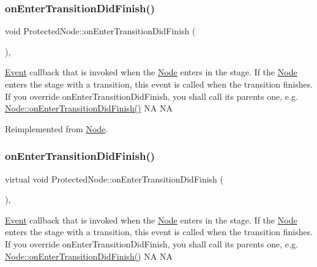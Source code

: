 \subsubsection{\texorpdfstring{on\+Enter\+Transition\+Did\+Finish()}{onEnterTransitionDidFinish()}\hspace{0.1cm}{\footnotesize\ttfamily [1/2]}}
{\footnotesize\ttfamily void Protected\+Node\+::on\+Enter\+Transition\+Did\+Finish (\begin{DoxyParamCaption}{ }\end{DoxyParamCaption})\hspace{0.3cm}{\ttfamily [override]}, {\ttfamily [virtual]}}

\hyperlink{classEvent}{Event} callback that is invoked when the \hyperlink{classNode}{Node} enters in the \textquotesingle{}stage\textquotesingle{}. If the \hyperlink{classNode}{Node} enters the \textquotesingle{}stage\textquotesingle{} with a transition, this event is called when the transition finishes. If you override on\+Enter\+Transition\+Did\+Finish, you shall call its parent\textquotesingle{}s one, e.\+g. \hyperlink{classNode_afef4b2a863042a9ea456e952cf26991d}{Node\+::on\+Enter\+Transition\+Did\+Finish()}  NA  NA 

Reimplemented from \hyperlink{classNode_afef4b2a863042a9ea456e952cf26991d}{Node}.

\mbox{\label{classProtectedNode_aac8fcdaf79295aa56c9b792d2e4135d6}} 
\subsubsection{\texorpdfstring{on\+Enter\+Transition\+Did\+Finish()}{onEnterTransitionDidFinish()}\hspace{0.1cm}{\footnotesize\ttfamily [2/2]}}
{\footnotesize\ttfamily virtual void Protected\+Node\+::on\+Enter\+Transition\+Did\+Finish (\begin{DoxyParamCaption}{ }\end{DoxyParamCaption})\hspace{0.3cm}{\ttfamily [override]}, {\ttfamily [virtual]}}

\hyperlink{classEvent}{Event} callback that is invoked when the \hyperlink{classNode}{Node} enters in the \textquotesingle{}stage\textquotesingle{}. If the \hyperlink{classNode}{Node} enters the \textquotesingle{}stage\textquotesingle{} with a transition, this event is called when the transition finishes. If you override on\+Enter\+Transition\+Did\+Finish, you shall call its parent\textquotesingle{}s one, e.\+g. \hyperlink{classNode_afef4b2a863042a9ea456e952cf26991d}{Node\+::on\+Enter\+Transition\+Did\+Finish()}  NA  NA 

